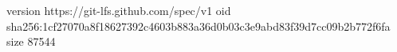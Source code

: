 version https://git-lfs.github.com/spec/v1
oid sha256:1cf27070a8f18627392c4603b883a36d0b03c3e9abd83f39d7cc09b2b772f6fa
size 87544
